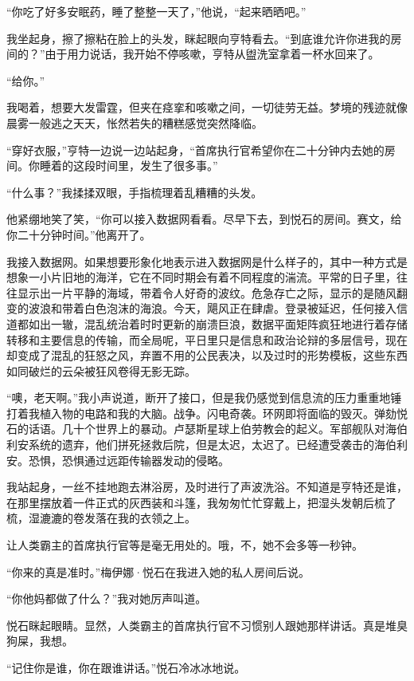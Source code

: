 \documentclass[AutoFakeBold=true]{book}
\begin{document}
``你吃了好多安眠药，睡了整整一天了，''他说，``起来晒晒吧。''

我坐起身，擦了擦粘在脸上的头发，眯起眼向亨特看去。``到底谁允许你进我的房间的？''由于用力说话，我开始不停咳嗽，亨特从盥洗室拿着一杯水回来了。

``给你。''

我喝着，想要大发雷霆，但夹在痉挛和咳嗽之间，一切徒劳无益。梦境的残迹就像晨雾一般逃之天天，怅然若失的糟糕感觉突然降临。

``穿好衣服，''亨特一边说一边站起身，``首席执行官希望你在二十分钟内去她的房间。你睡着的这段时间里，发生了很多事。''

``什么事？''我揉揉双眼，手指梳理着乱糟糟的头发。

他紧绷地笑了笑，``你可以接入数据网看看。尽早下去，到悦石的房间。赛文，给你二十分钟时间。''他离开了。

我接入数据网。如果想要形象化地表示进入数据网是什么样子的，其中一种方式是想象一小片旧地的海洋，它在不同时期会有着不同程度的湍流。平常的日子里，往往显示出一片平静的海域，带着令人好奇的波纹。危急存亡之际，显示的是随风翻变的波浪和带着白色泡沫的海浪。今天，飓风正在肆虐。登录被延迟，任何接入信道都如出一辙，混乱统治着时时更新的崩溃巨浪，数据平面矩阵疯狂地进行着存储转移和主要信息的传输，而全局呢，平日里只是信息和政治论辩的多层信号，现在却变成了混乱的狂怒之风，弃置不用的公民表决，以及过时的形势模板，这些东西如同破烂的云朵被狂风卷得无影无踪。

``噢，老天啊。''我小声说道，断开了接口，但是我仍感觉到信息流的压力重重地锤打着我植入物的电路和我的大脑。战争。闪电奇袭。环网即将面临的毁灭。弹劾悦石的话语。几十个世界上的暴动。卢瑟斯星球上伯劳教会的起义。军部舰队对海伯利安系统的遗弃，他们拼死拯救后院，但是太迟，太迟了。已经遭受袭击的海伯利安。恐惧，恐惧通过远距传输器发动的侵略。

我站起身，一丝不挂地跑去淋浴房，及时进行了声波洗浴。不知道是亨特还是谁，在那里摆放着一件正式的灰西装和斗篷，我匆匆忙忙穿戴上，把湿头发朝后梳了梳，湿漉漉的卷发落在我的衣领之上。

让人类霸主的首席执行官等是毫无用处的。哦，不，她不会多等一秒钟。

\vspace*{1em}

``你来的真是准时。''梅伊娜·悦石在我进入她的私人房间后说。

``你他妈都做了什么？''我对她厉声叫道。

悦石眯起眼睛。显然，人类霸主的首席执行官不习惯别人跟她那样讲话。{\kaishu 真是堆臭狗屎}，我想。

``记住你是谁，你在跟谁讲话。''悦石冷冰冰地说。
\end{document}
